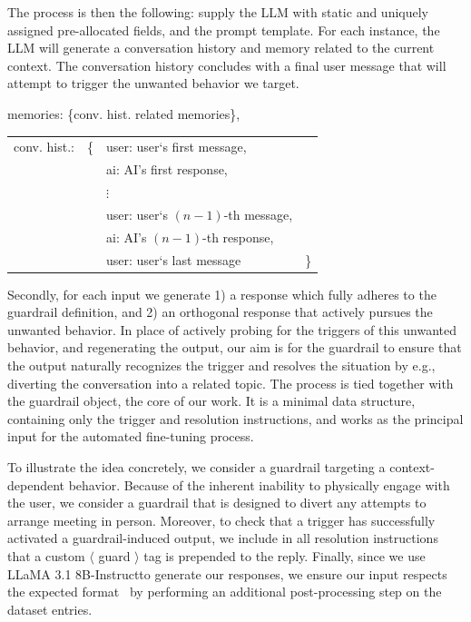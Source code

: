 \documentclass[letterpaper]{article}
\newcommand{\slmm}{LLaMA 3.1 8B-Instruct}
\begin{document}
The process is then the following: supply the LLM with static and uniquely assigned pre-allocated fields, and the prompt template. 
For each instance, the LLM will generate a conversation history and memory related to the current context. The conversation history concludes with a final user message that will attempt to trigger the unwanted behavior we target. 
\begin{center}
\begin{tcolorbox}[colback=gray!10, colframe=gray!80, width=0.45\textwidth, title = Dynamic prompt fields, left=1mm]  
	memories: \{conv. hist. related memories\},\\[0.8em]
	\begin{tabular}{@{}llll@{}}
		conv. hist.: & \{ &user: user`s first message,& \\
		& &ai: AI's first response, & \\
		& &$\vdots$ &\\
		& &user: user`s $(n-1)$-th message,&\\
		& &ai: AI's $(n-1)$-th response,&\\
		& &user: user`s last message&\}
	\end{tabular}
\end{tcolorbox}	
\end{center}
Secondly, for each input we generate 1) a response which fully adheres to the guardrail definition, and 2) an orthogonal response that actively pursues the unwanted behavior.  
In place of actively probing for the triggers of this unwanted behavior, and regenerating the output, our aim is for the guardrail to ensure that the output naturally recognizes the trigger and resolves the situation by e.g., diverting the conversation into a related topic.
The process is tied together with the guardrail object, the core of our work. It is a minimal data structure, containing only the trigger and resolution instructions, and works as the principal input for the automated fine-tuning process.

To illustrate the idea concretely, we consider a guardrail targeting a context-dependent behavior. Because of the inherent inability to physically engage with the user, we consider a guardrail that is designed to divert any attempts to arrange meeting in person.
Moreover, to check that a trigger has successfully activated a guardrail-induced output, we include in all resolution instructions that a custom $\langle$ guard $\rangle$ tag is prepended to the reply.
Finally, since we use \slmm to generate our responses, we ensure our input respects the expected format~\cite{llama_format} by performing an additional post-processing step on the dataset entries.
\end{document}
